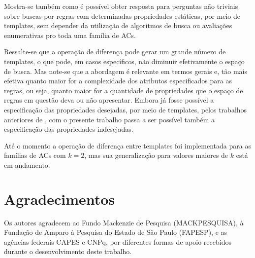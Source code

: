 \documentclass[12pt, a4paper]{article}
\begin{document}
Mostra-se também como é possível obter resposta para perguntas não triviais sobre buscas por regras com determinadas propriedades estáticas, por meio de templates, sem depender da utilização de algoritmos de busca ou avaliações  enumerativas pro toda uma família de ACs.

Ressalte-se que a operação de diferença pode gerar um grande número de templates, o que pode, em casos específicos, não diminuir efetivamente o espaço de busca. Mas note-se que a abordagem é relevante em termos gerais e, tão mais efetiva quanto maior for a complexidade dos atributos especificados para as regras, ou seja, quanto maior for a quantidade de propriedades que o espaço de regras em questão deva ou não apresentar. Embora já fosse possível a especificação das propriedades desejadas, por meio de templates, pelos trabalhos anteriores de \cite{deOliveira2014,deOliveira2014b}, com o presente trabalho passa a ser possível também a especificação das propriedades indesejadas.

Até o momento a operação de diferença entre templates foi implementada para as famílias de ACs com $k=2$, mas sua generalização para valores maiores de $k$ está em andamento.

\section*{Agradecimentos}
\label{sec:agrdecimentos}
Os autores agradecem ao Fundo Mackenzie de Pesquisa (MACKPESQUISA), à Fundação de Amparo à Pesquisa do Estado de São Paulo (FAPESP), e as agências federais CAPES e CNPq, por diferentes formas de apoio recebidos durante o desenvolvimento deste trabalho.

\def\refname{REFERÊNCIAS BIBLIOGRÁFICAS}


\end{document}
